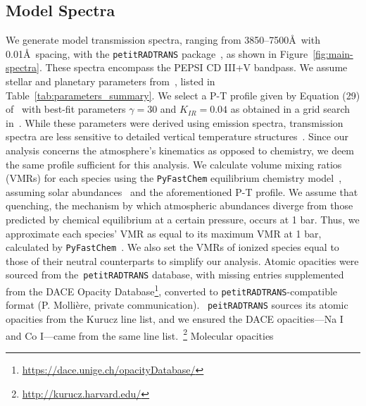 \documentclass[twocolumn]{aastex631}
\newcommand{\code}[1]{\texttt{#1}}
\begin{document}
        \subsection{Model Spectra}\label{subsec:Model Spectra}
            We generate model transmission spectra, ranging from 3850--7500\AA\ with 0.01\AA\ spacing, with the \code{petitRADTRANS} package~\citep{petitRADTRANS}, as shown in Figure~\ref{fig:main-spectra}. These spectra encompass the PEPSI CD III+V bandpass. We assume stellar and planetary parameters from~\citet{Lund2017}, listed in Table~\ref{tab:parameters_summary}. We select a P-T profile given by Equation (29) of~\citet{Guillot2010} with best-fit parameters $\gamma = 30$ and $K_{IR} = 0.04$ as obtained in a grid search in~\citet{Johnson2023}. While these parameters were derived using emission spectra, transmission spectra are less sensitive to detailed vertical temperature structures~\citep{Kesseli2020}. Since our analysis concerns the atmosphere's kinematics as opposed to chemistry, we deem the same profile sufficient for this analysis. 
            We calculate volume mixing ratios (VMRs) for each species using the \code{PyFastChem} equilibrium chemistry model~\citep{Stock2018, Stock2022, Kitzmann2023}, assuming solar abundances~\citep{Asplund2021} and the aforementioned P-T profile. We assume that quenching, the mechanism by which atmospheric abundances diverge from those predicted by chemical equilibrium at a certain pressure, occurs at 1 bar. Thus, we approximate each species' VMR as equal to its maximum VMR at 1 bar, calculated by \code{PyFastChem}~\citep{Johnson2023,Petz2023}. We also set the VMRs of ionized species equal to those of their neutral counterparts to simplify our analysis. 
            Atomic opacities were sourced from the~\code{petitRADTRANS} database, with missing entries supplemented from the DACE Opacity Database\footnote{\url{https://dace.unige.ch/opacityDatabase/}}, converted to \code{petitRADTRANS}-compatible format (P. Mollière, private communication). ~\code{peitRADTRANS} sources its atomic opacities from the Kurucz line list, and we ensured the DACE opacities---Na I and Co I---came from the same line list.~\footnote{\url{http://kurucz.harvard.edu/}} Molecular opacities 
        
\end{document}
